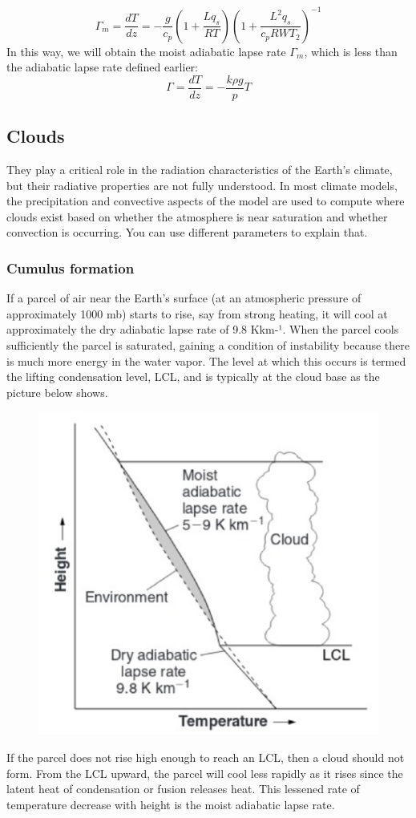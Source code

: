 \begin{equation}\label{eq.adiabatic lapse rate}
    \Gamma_m= \frac{dT}{dz} = -\frac{g}{c_p} \left( 1 + \frac{L q_s}{R T} \right) \left( 1 + \frac{L^2 q_s}{c_p R W T_2} \right)^{-1}
\end{equation}
In this way, we will obtain the moist adiabatic lapse rate $\Gamma_m$, which is less than the adiabatic lapse rate defined earlier: $$\Gamma=\frac{dT}{dz}=-\frac{k\rho g}{p}T$$



\subsection{Clouds}
They play a critical role in the radiation characteristics of the Earth's climate, but their radiative properties are not fully understood. In most climate models, the precipitation and convective aspects of the model are used to compute where clouds exist based on whether the atmosphere is near saturation and whether convection is occurring. You can use different parameters to explain that. 

\subsubsection{Cumulus formation}
If a parcel of air near the Earth's surface (at an atmospheric pressure of approximately 1000 mb) starts to rise, say from strong heating, it will cool at approximately the dry adiabatic lapse rate of 9.8 Kkm-¹. When the parcel cools sufficiently the parcel is saturated, gaining a condition of instability because there is much more energy in the water vapor. The level at which this occurs is termed the lifting condensation level, LCL, and is typically at the cloud base as the picture below shows. 
\begin{figure}[htpb]
    \centering
    \includegraphics[width=0.4\linewidth]{uploads/image14.png}
  
\end{figure}
If the parcel does not rise high enough to reach an LCL, then a cloud should not form. From the LCL upward, the parcel will cool less rapidly as it rises since the latent heat of condensation or fusion releases heat. This lessened rate of temperature decrease with height is the moist adiabatic lapse rate. 

